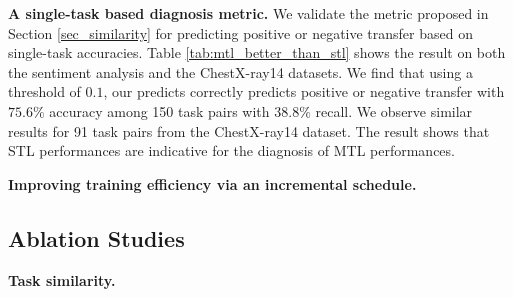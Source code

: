 \textbf{A single-task based diagnosis metric.}
We validate the metric proposed in Section \ref{sec_similarity} for predicting positive or negative transfer based on single-task accuracies.
Table \ref{tab:mtl_better_than_stl} shows the result on both the sentiment analysis and the ChestX-ray14 datasets.
We find that using a threshold of $0.1$, our predicts correctly predicts positive or negative transfer with $75.6\%$ accuracy among 150 task pairs with $38.8\%$ recall.
We observe similar results for 91 task pairs from the ChestX-ray14 dataset.
The result shows that STL performances are indicative for the diagnosis of MTL performances.

\textbf{Improving training efficiency via an incremental schedule.}
\todo{}

\subsection{Ablation Studies}


\textbf{Task similarity.} \todo{}

